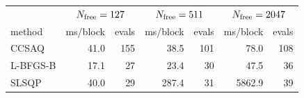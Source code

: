 \begin{tabular}{l r r r r r r}
 & \multicolumn{2}{c}{$N_{\rm free}=127$} & \multicolumn{2}{c}{$N_{\rm free}=511$} & \multicolumn{2}{c}{$N_{\rm free}=2047$} \\
method & ms/block & evals & ms/block & evals & ms/block & evals \\
\hline
CCSAQ & 41.0 & 155 & 38.5 & 101 & 78.0 & 108 \\
L-BFGS-B & 17.1 & 27 & 23.4 & 30 & 47.5 & 36 \\
SLSQP & 40.0 & 29 & 287.4 & 31 & 5862.9 & 39 \\
\end{tabular}
